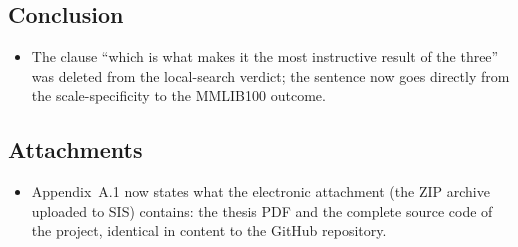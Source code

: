 \subsection*{Conclusion}
\begin{itemize}
  \item The clause ``which is what makes it the most instructive result
        of the three'' was deleted from the local-search verdict; the
        sentence now goes directly from the scale-specificity to the
        MMLIB100 outcome.
\end{itemize}

\subsection*{Attachments}
\begin{itemize}
  \item Appendix~A.1 now states what the electronic attachment (the ZIP
        archive uploaded to SIS) contains: the thesis PDF and the
        complete source code of the project, identical in content to the
        GitHub repository.
\end{itemize}

